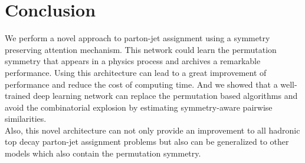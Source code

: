 \chapter{Conclusion}

We perform a novel approach to parton-jet assignment using a symmetry preserving attention mechanism. This network could learn the permutation symmetry that appears in a physics process and archives a remarkable performance. Using this architecture can lead to a great improvement of performance and reduce the cost of computing time. And we showed that a well-trained deep learning network can replace the permutation based algorithms and avoid the combinatorial explosion by estimating symmetry-aware pairwise similarities.
\\
Also, this novel architecture can not only provide an improvement to all hadronic top decay parton-jet assignment problems but also can be generalized to other models which also contain the permutation symmetry. 